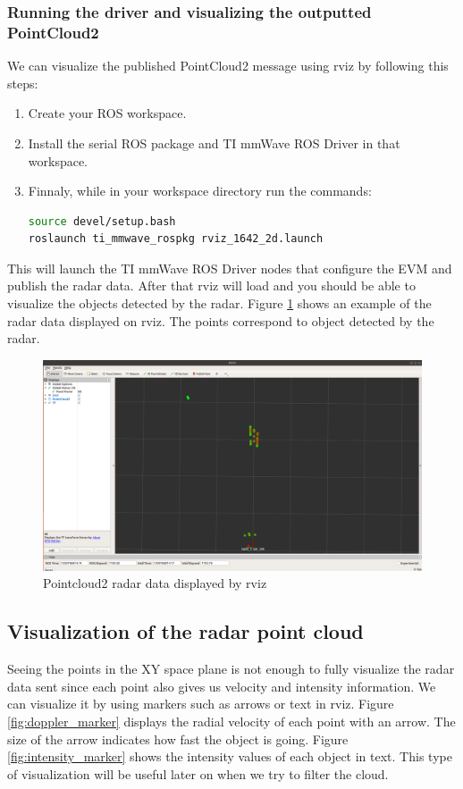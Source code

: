 \documentclass[12pt]{article}
\begin{document}
\subsubsection{Running the driver and visualizing the outputted PointCloud2}
We can visualize the published PointCloud2 message using rviz by following this steps:
\begin{enumerate}
    \item Create your ROS workspace.
    \item Install the serial ROS package and TI mmWave ROS Driver in that workspace.
    \item  Finnaly, while in your workspace directory run the commands:
    \begin{lstlisting}[language=bash]
source devel/setup.bash
roslaunch ti_mmwave_rospkg rviz_1642_2d.launch
\end{lstlisting}
\end{enumerate}
This will launch the TI mmWave ROS Driver nodes that configure the EVM and publish the radar data. After that rviz will load and you should be able to visualize the objects detected by the radar. Figure \ref{fig:radar_rviz} shows an example of the radar data displayed on rviz. The points correspond to object detected by the radar.
\begin{figure}[!htb]
    \centering
    \includegraphics[scale=0.2]{pc_not_filt.png}
    \caption{Pointcloud2 radar data displayed by rviz}
    \label{fig:radar_rviz}
\end{figure}
\subsection{Visualization of the radar point cloud}
Seeing the points in the XY space plane is not enough to fully visualize the radar data sent since each point also gives us velocity and intensity information.
We can visualize it by using markers such as arrows or text in rviz.
Figure \ref{fig:doppler_marker} displays the radial velocity of each point with an arrow. The size of the arrow indicates how fast the object is going. Figure \ref{fig:intensity_marker} shows the intensity values of each object in text. This type of visualization will be useful later on when we try to filter the cloud.
\end{document}
